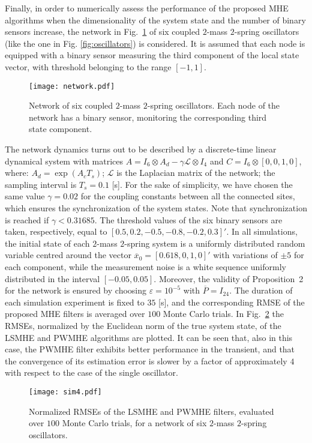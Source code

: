 \documentclass[11pt,journal,onecolumn]{IEEEtran}
\begin{document}
Finally, in order to numerically assess the performance of the proposed MHE algorithms when the dimensionality of the system state and the number of  binary sensors increase, the network in Fig.~\ref{fig:network} of six coupled $2$-mass $2$-spring oscillators (like the one in Fig. \ref{fig:oscillators}) is considered. It is assumed that each node is equipped with a binary sensor measuring the third component of the local state vector, with threshold belonging to the range $[-1,1]$.
\begin{figure}[tb]
\centering
\texttt{[image: network.pdf]}
\caption{Network of six coupled $2$-mass $2$-spring oscillators. Each node of the network has a binary sensor, monitoring the corresponding third state component.}
\label{fig:network}
\end{figure}
The network dynamics turns out to be described by a discrete-time linear dynamical system with matrices  $A = I_{6}\otimes A_{d} - \gamma  \mathcal{L}\otimes I_{4}$ and $C = I_{6}\otimes [0,0,1,0]$, where: $A_{d} = \exp(A_{c}T_{s})$; $\mathcal{L}$ is the Laplacian matrix of the network; the sampling interval is $T_s = 0.1$ [s]. For the sake of simplicity, we have chosen the same value $\gamma=0.02$ for the coupling constants between all the connected sites, which ensures the synchronization of the system states. Note that synchronization is reached if $\gamma < 0.31685$. The threshold values of the six binary sensors are taken, respectively, equal to $[0.5,0.2,-0.5,-0.8,-0.2,0.3]'$. In all  simulations, the initial state of each $2$-mass $2$-spring system is a uniformly distributed random variable centred around the vector $\overline{x}_{0} = [0.618,0,1,0]'$ with variations of $\pm 5$ for each component, while the measurement noise is a white sequence uniformly distributed in the interval $[-0.05,0.05]$. Moreover, the validity of Proposition~2 for the network is ensured by choosing $\varepsilon = 10^{-5}$ with $\overline{P} = I_{24}$. The duration of each simulation experiment is fixed to $35$ [s], and the corresponding RMSE of the proposed MHE filters is averaged over $100$ Monte Carlo trials. In Fig.~\ref{fig:RMSE_network} the RMSEs, normalized by the Euclidean norm of the true system state, of the LSMHE and PWMHE algorithms are plotted. It can be seen that, also in this case, the PWMHE filter exhibits better performance in the transient, and that the convergence of its estimation error is slower by a factor of approximately $4$ with respect to the case of the single oscillator.
\begin{figure}[tb]
\centering
\texttt{[image: sim4.pdf]}
\caption{Normalized RMSEs of the LSMHE and PWMHE filters, evaluated over $100$ Monte Carlo trials, for a network of six $2$-mass $2$-spring oscillators.}
\label{fig:RMSE_network}
\end{figure}
\end{document}
